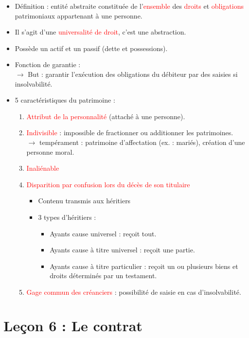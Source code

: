\begin{itemize}
	\item Définition : entité abstraite constituée de l'\textcolor{red}{ensemble} des \textcolor{red}{droits} et \textcolor{red}{obligations} patrimoniaux appartenant à une personne.
	\item Il s'agit d'une \textcolor{red}{universalité de droit}, c'est une abstraction.
	\item Possède un actif et un passif (dette et possessions).
	\item Fonction de garantie :\\
	$\rightarrow$ But : garantir l'exécution des obligations du débiteur par des saisies si insolvabilité.
	\item 5 caractéristiques du patrimoine :
	\begin{enumerate}
		\item \textcolor{red}{Attribut de la personnalité} (attaché à une personne).
		\item \textcolor{red}{Indivisible} : impossible de fractionner ou additionner les patrimoines.\\
		$\rightarrow$ tempérament : patrimoine d'affectation (ex. : mariés), création d'une personne moral.
		\item \textcolor{red}{Inaliénable}
		\item \textcolor{red}{Disparition par confusion lors du décès de son titulaire}
		\begin{itemize}
			\item Contenu transmis aux héritiers
			\item 3 types d'héritiers :
			\begin{itemize}
				\item Ayants cause universel : reçoit tout.
				\item Ayants cause à titre universel : reçoit une partie.
				\item Ayants cause à titre particulier : reçoit un ou plusieurs biens et droits déterminés par un testament.
			\end{itemize}
		\end{itemize}
		\item \textcolor{red}{Gage commun des créanciers} : possibilité de saisie en cas d'insolvabilité.
	\end{enumerate}
\end{itemize}

\newpage
\chapter{Leçon 6 : Le contrat}

